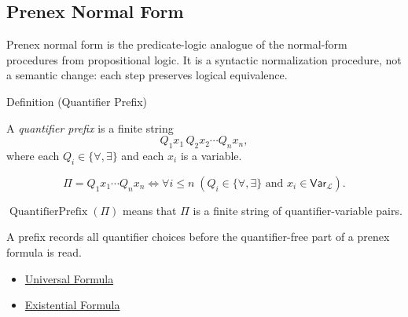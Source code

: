 
\subsection*{Prenex Normal Form}

\begin{remark*}
Prenex normal form is the predicate-logic analogue of the normal-form
procedures from propositional logic. It is a syntactic normalization procedure,
not a semantic change: each step preserves logical equivalence.
\end{remark*}

\begin{definitionbox}{Definition (Quantifier Prefix)}
\begin{definition}
\label{def:quantifier-prefix}
A \emph{quantifier prefix} is a finite string
\[
Q_1x_1\,Q_2x_2\cdots Q_nx_n,
\]
where each \(Q_i\in\{\forall,\exists\}\) and each \(x_i\) is a variable.
\end{definition}
\end{definitionbox}

\begin{remark*}
\[
\Pi=Q_1x_1\cdots Q_nx_n
\Longleftrightarrow
\forall i\leq n\;(Q_i\in\{\forall,\exists\}\text{ and }x_i\in\mathsf{Var}_{\mathcal L}).
\]
\end{remark*}

\begin{remark*}
\(\operatorname{QuantifierPrefix}(\Pi)\) means that \(\Pi\) is a finite string
of quantifier-variable pairs.
\end{remark*}

\begin{remark*}[Interpretation]
A prefix records all quantifier choices before the quantifier-free part of a
prenex formula is read.
\end{remark*}

\begin{dependencies}
\begin{itemize}
  \item \hyperref[def:universal-q]{Universal Formula}
  \item \hyperref[def:existential-q]{Existential Formula}
\end{itemize}
\end{dependencies}

